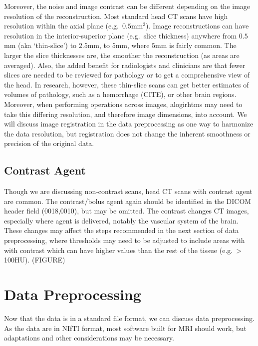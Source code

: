 \documentclass[]{elsarticle} %
\begin{document}
Moreover, the noise and image contrast can be different depending on the
image resolution of the reconstruction. Most standard head CT scans have
high resolution within the axial plane (e.g.~\(0.5\)mm\(^2\)). Image
reconstructions can have resolution in the interior-superior plane
(e.g.~slice thickness) anywhere from \(0.5\)mm (aka `thin-slice') to
\(2.5\)mm, to \(5\)mm, where \(5\)mm is fairly common. The larger the
slice thicknesses are, the smoother the reconstruction (as areas are
averaged). Also, the added benefit for radiologists and clinicians are
that fewer slices are needed to be reviewed for pathology or to get a
comprehensive view of the head. In research, however, these thin-slice
scans can get better estimates of volumes of pathology, such as a
hemorrhage (CITE), or other brain regions. Moreover, when performing
operations across images, alogirhtms may need to take this differing
resolution, and therefore image dimensions, into account. We will
discuss image registration in the data preprocessing as one way to
harmonize the data resolution, but registration does not change the
inherent smoothness or precision of the original data.

\hypertarget{contrast-agent}{%
\subsection{Contrast Agent}\label{contrast-agent}}

Though we are discussing non-contrast scans, head CT scans with contrast
agent are common. The contrast/bolus agent again should be identified in
the DICOM header field (0018,0010), but may be omitted. The contrast
changes CT images, especially where agent is delivered, notably the
vascular system of the brain. These changes may affect the steps
recommended in the next section of data preprocessing, where thresholds
may need to be adjusted to include areas with with contrast which can
have higher values than the rest of the tissue (e.g.~\textgreater{}
100HU). (FIGURE)

\hypertarget{data-preprocessing}{%
\section{Data Preprocessing}\label{data-preprocessing}}

Now that the data is in a standard file format, we can discuss data
preprocessing. As the data are in NIfTI format, most software built for
MRI should work, but adaptations and other considerations may be
necessary.
\end{document}
